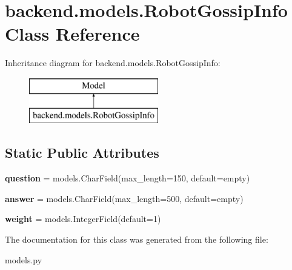\hypertarget{classbackend_1_1models_1_1_robot_gossip_info}{}\section{backend.\+models.\+Robot\+Gossip\+Info Class Reference}
\label{classbackend_1_1models_1_1_robot_gossip_info}
Inheritance diagram for backend.\+models.\+Robot\+Gossip\+Info\+:\begin{figure}[H]
\begin{center}
\leavevmode
\includegraphics[height=2.000000cm]{classbackend_1_1models_1_1_robot_gossip_info}
\end{center}
\end{figure}
\subsection*{Static Public Attributes}
\begin{DoxyCompactItemize}
\item 
\mbox{\label{classbackend_1_1models_1_1_robot_gossip_info_a90210f78f32779caed97c97ae01dac60}} 
{\bfseries question} = models.\+Char\+Field(max\+\_\+length=150, default=\textquotesingle{}empty\textquotesingle{})
\item 
\mbox{\label{classbackend_1_1models_1_1_robot_gossip_info_adc77a4dc8003d7a4aee99da89b73d5b3}} 
{\bfseries answer} = models.\+Char\+Field(max\+\_\+length=500, default=\textquotesingle{}empty\textquotesingle{})
\item 
\mbox{\label{classbackend_1_1models_1_1_robot_gossip_info_add18723982e6c3272edb001c841c7ca1}} 
{\bfseries weight} = models.\+Integer\+Field(default=1)
\end{DoxyCompactItemize}


The documentation for this class was generated from the following file\+:\begin{DoxyCompactItemize}
\item 
models.\+py\end{DoxyCompactItemize}
